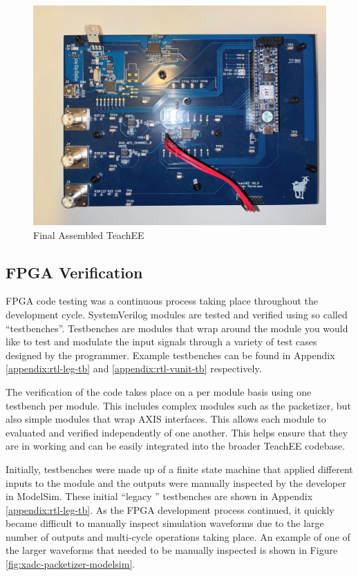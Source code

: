 \documentclass[letterpaper,11pt]{article}
\begin{document}
\begin{figure}[H]
  \centering
  \includegraphics[width=\textwidth]{figures/pcb-final.jpg}
  \caption{Final Assembled TeachEE}
  \label{fig:pcb-final}
\end{figure}

\subsection{FPGA Verification} %


FPGA code testing was a continuous process taking place throughout the
development cycle. SystemVerilog modules are tested and verified using so called
``testbenches''. Testbenches are modules that wrap around the module you would
like to test and modulate the input signals through a variety of test cases
designed by the programmer. Example testbenches can be found in Appendix
\ref{appendix:rtl-leg-tb} and \ref{appendix:rtl-vunit-tb} respectively.

The verification of the code takes place on a per module basis using one
testbench per module. This includes complex modules such as the packetizer, but
also simple modules that wrap AXIS interfaces. This allows each module to
evaluated and verified independently of one another. This helps ensure that they
are in working and can be easily integrated into the broader TeachEE codebase.

Initially, testbenches were made up of a finite state machine that applied
different inputs to the module and the outputs were manually inspected by the
developer in ModelSim. These initial ``legacy '' testbenches are shown in
Appendix \ref{appendix:rtl-leg-tb}. As the FPGA development process continued,
it quickly became difficult to manually inspect simulation waveforms due to the
large number of outputs and multi-cycle operations taking place. An example of
one of the larger waveforms that needed to be manually inspected is shown in
Figure \ref{fig:xadc-packetizer-modelsim}.
\end{document}
